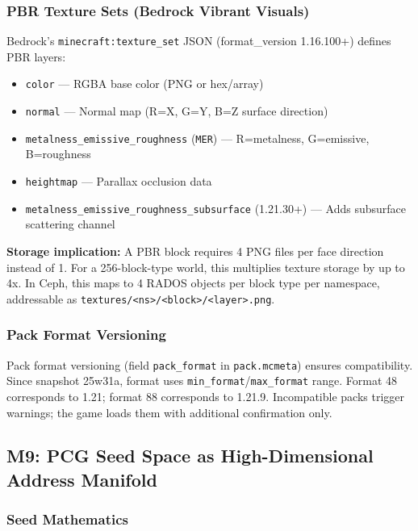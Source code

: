 \documentclass[11pt,letterpaper]{article}
\begin{document}
\subsubsection{PBR Texture Sets (Bedrock Vibrant Visuals)}

Bedrock's \texttt{minecraft:texture\_set} JSON (format\_version 1.16.100+) defines PBR layers:
\begin{itemize}[leftmargin=2em]
  \item \texttt{color} --- RGBA base color (PNG or hex/array)
  \item \texttt{normal} --- Normal map (R=X, G=Y, B=Z surface direction)
  \item \texttt{metalness\_emissive\_roughness} (\texttt{MER}) --- R=metalness, G=emissive, B=roughness
  \item \texttt{heightmap} --- Parallax occlusion data
  \item \texttt{metalness\_emissive\_roughness\_subsurface} (1.21.30+) --- Adds subsurface scattering channel
\end{itemize}

\textbf{Storage implication:} A PBR block requires 4 PNG files per face direction instead of 1. For a 256-block-type world, this multiplies texture storage by up to 4x. In Ceph, this maps to 4 RADOS objects per block type per namespace, addressable as \texttt{textures/<ns>/<block>/<layer>.png}.

\subsubsection{Pack Format Versioning}

Pack format versioning (field \texttt{pack\_format} in \texttt{pack.mcmeta}) ensures compatibility. Since snapshot 25w31a, format uses \texttt{min\_format}/\texttt{max\_format} range. Format 48 corresponds to 1.21; format 88 corresponds to 1.21.9. Incompatible packs trigger warnings; the game loads them with additional confirmation only.

\subsection{M9: PCG Seed Space as High-Dimensional Address Manifold}

\subsubsection{Seed Mathematics}
\end{document}
